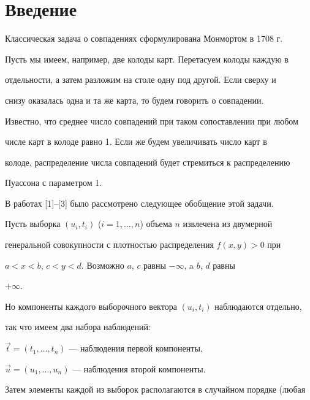 \label{begin}





\section{Введение}





Классическая задача о совпадениях сформулирована Монмортом в 1708 г.


Пусть мы имеем, например, две колоды карт. Перетасуем колоды каждую в


отдельности, а затем разложим на столе одну под другой. Если сверху и


снизу оказалась одна и та же карта, то будем говорить о совпадении.


Известно, что среднее число совпадений при таком сопоставлении при любом


числе карт в колоде равно 1. Если же будем увеличивать число карт в


колоде, распределение числа совпадений будет стремиться к распределению


Пуассона с параметром 1.





В работах [1]--[3] было рассмотрено следующее обобщение этой задачи.


Пусть выборка $(u_i,t_i)$ ($i=1,\dotsc,n$) объема $n$ извлечена из двумерной


генеральной совокупности с плотностью распределения $f(x,y)>0$ при


$a<x<b$, $c<y<d.$ Возможно $a$, $c$ равны $-\infty$, a $b$, $d$ равны


$+\infty$.


Но компоненты каждого выборочного вектора $(u_i,t_i)$ наблюдаются отдельно,


так что имеем два набора наблюдений:





$\Vec t=(t_1,\dotsc ,t_n)$ --- наблюдения первой компоненты,





$\Vec u=(u_1,\dotsc ,u_n)$ --- наблюдения второй компоненты.





Затем элементы каждой из выборок располагаются в случайном порядке (любая


